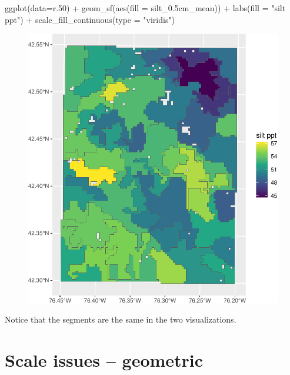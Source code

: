 \documentclass[
  letterpaper,
  DIV=11,
  numbers=noendperiod]{scrartcl}
\newenvironment{Shaded}{\begin{snugshade}}{\end{snugshade}}
\newcommand{\AttributeTok}[1]{\textcolor[rgb]{0.40,0.45,0.13}{#1}}
\newcommand{\FloatTok}[1]{\textcolor[rgb]{0.68,0.00,0.00}{#1}}
\newcommand{\FunctionTok}[1]{\textcolor[rgb]{0.28,0.35,0.67}{#1}}
\newcommand{\NormalTok}[1]{\textcolor[rgb]{0.00,0.23,0.31}{#1}}
\newcommand{\SpecialCharTok}[1]{\textcolor[rgb]{0.37,0.37,0.37}{#1}}
\newcommand{\StringTok}[1]{\textcolor[rgb]{0.13,0.47,0.30}{#1}}
\begin{document}
\begin{Shaded}
\begin{Highlighting}[]
\FunctionTok{ggplot}\NormalTok{(}\AttributeTok{data=}\NormalTok{r}\FloatTok{.50}\NormalTok{) }\SpecialCharTok{+}
  \FunctionTok{geom\_sf}\NormalTok{(}\FunctionTok{aes}\NormalTok{(}\AttributeTok{fill =}\NormalTok{ silt\_0}\FloatTok{.5}\NormalTok{cm\_mean)) }\SpecialCharTok{+}
  \FunctionTok{labs}\NormalTok{(}\AttributeTok{fill =} \StringTok{"silt ppt"}\NormalTok{) }\SpecialCharTok{+}
  \FunctionTok{scale\_fill\_continuous}\NormalTok{(}\AttributeTok{type =} \StringTok{"viridis"}\NormalTok{)}
\end{Highlighting}
\end{Shaded}

\begin{figure}[H]

{\centering \includegraphics{PatternAnalysisWorkshopTutorial_files/figure-pdf/supercells-multiple-2.pdf}

}

\end{figure}

Notice that the segments are the same in the two visualizations.

\hypertarget{sec-scale-geometry}{%
\section{Scale issues -- geometric}\label{sec-scale-geometry}}
\end{document}
